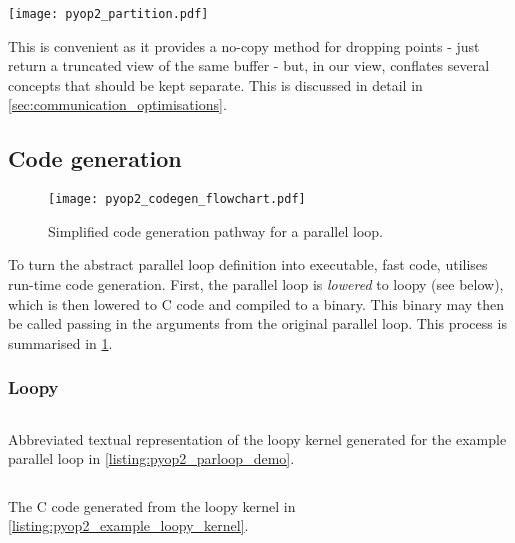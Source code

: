 \documentclass[thesis]{subfiles}
\begin{document}
\begin{center}
  \texttt{[image: pyop2\_partition.pdf]}
\end{center}

This is convenient as it provides a no-copy method for dropping \ghostiter points - just return a truncated view of the same buffer - but, in our view, conflates several concepts that should be kept separate.
This is discussed in detail in \cref{sec:communication_optimisations}.

\subsection{Code generation}
\label{sec:pyop2_codegen}

\begin{figure}
  \texttt{[image: pyop2\_codegen\_flowchart.pdf]}
  \caption{Simplified code generation pathway for a  parallel loop.}
  \label{fig:pyop2_codegen}
\end{figure}

To turn the abstract parallel loop definition into executable, fast code,  utilises run-time code generation.
First, the parallel loop is \emph{lowered} to loopy (see below), which is then lowered to C code and compiled to a binary.
This binary may then be called passing in the arguments from the original parallel loop.
This process is summarised in \cref{fig:pyop2_codegen}.

\subsubsection{Loopy}

\begin{listing}
  \centering
  \begin{minipage}{.9\textwidth}
    \inputminted{text}{./scripts/artefacts/pyop2_example_loopy_kernel_tidy.txt}
  \end{minipage}
  \caption{
    Abbreviated textual representation of the loopy kernel generated for the example parallel loop in \cref{listing:pyop2_parloop_demo}.
  }
  \label{listing:pyop2_example_loopy_kernel}
\end{listing}

\begin{listing}
  \centering
  \begin{minipage}{.9\textwidth}
    \inputminted{c}{./scripts/artefacts/pyop2_example_c_code_tidy.c}
  \end{minipage}
  \caption{
    The C code generated from the loopy kernel in \cref{listing:pyop2_example_loopy_kernel}.
  }
  \label{listing:pyop2_example_c_code}
\end{listing}
\end{document}
